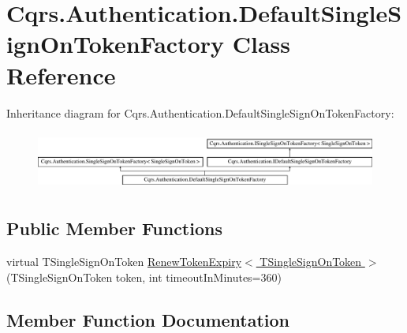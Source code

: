 \hypertarget{classCqrs_1_1Authentication_1_1DefaultSingleSignOnTokenFactory}{}\section{Cqrs.\+Authentication.\+Default\+Single\+Sign\+On\+Token\+Factory Class Reference}
\label{classCqrs_1_1Authentication_1_1DefaultSingleSignOnTokenFactory}
Inheritance diagram for Cqrs.\+Authentication.\+Default\+Single\+Sign\+On\+Token\+Factory\+:\begin{figure}[H]
\begin{center}
\leavevmode
\includegraphics[height=1.967213cm]{classCqrs_1_1Authentication_1_1DefaultSingleSignOnTokenFactory}
\end{center}
\end{figure}
\subsection*{Public Member Functions}
\begin{DoxyCompactItemize}
\item 
virtual T\+Single\+Sign\+On\+Token \hyperlink{classCqrs_1_1Authentication_1_1DefaultSingleSignOnTokenFactory_a1bb480afd0a467461b0db59da641fe29}{Renew\+Token\+Expiry$<$ T\+Single\+Sign\+On\+Token $>$} (T\+Single\+Sign\+On\+Token token, int timeout\+In\+Minutes=360)
\end{DoxyCompactItemize}


\subsection{Member Function Documentation}
\mbox{\label{classCqrs_1_1Authentication_1_1DefaultSingleSignOnTokenFactory_a1bb480afd0a467461b0db59da641fe29}} 
